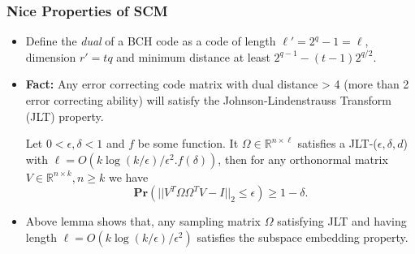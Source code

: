 \documentclass[9pt]{beamer}
\newcommand{\mB}{\mathbb}
\begin{document}
\begin{frame}
\frametitle{Nice Properties of SCM} 
\begin{itemize} 
\item Define the \textit{dual} of a BCH code as a code of length $\ell' = 2^q - 1 = \ell$, dimension $r' = tq$ and minimum distance at least $2^{q-1} - (t - 1)2^{q/2}$.
\vspace{3mm}

\item \textbf{Fact:} Any error correcting code matrix with dual distance > 4 (more than 2 error correcting ability) will satisfy the Johnson-Lindenstrauss Transform (JLT) property.
\vspace{3mm}

\begin{lemma}
Let $0< \epsilon, \delta < 1$ and $f$ be some function. It $\Omega \in \mB{R}^{n \times \ell}$ satisfies a JLT-($\epsilon, \delta, d$) with $\ell = O(k \log(k /\epsilon)/\epsilon^2. f(\delta))$, then for any orthonormal matrix $V \in \mB{R}^{n \times k}, n \ge k$ we have 
\[ \textbf{Pr}(|| V^T \Omega \Omega^TV - I||_2 \le \epsilon) \ge 1 - \delta. \]
\end{lemma}

\vspace{3mm}
\item Above lemma shows that, any sampling matrix $\Omega$ satisfying JLT and having length $\ell = O(k \log(k/\epsilon) / \epsilon^2)$ satisfies the subspace embedding property.
\end{itemize}
\end{frame}
\end{document}
